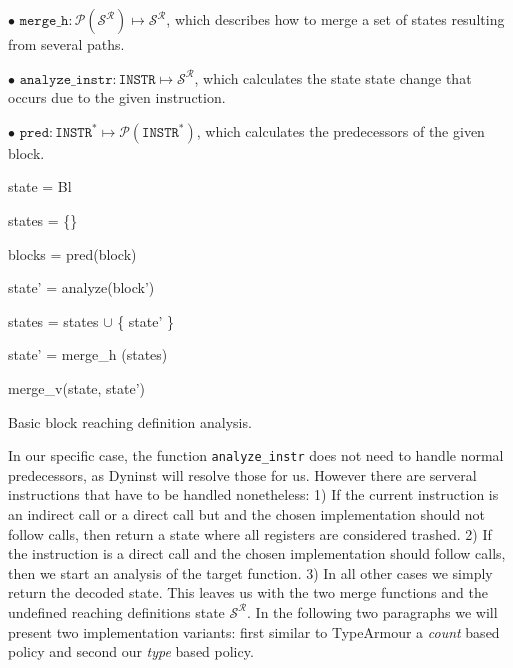 $\bullet$ $\texttt{merge\_h} : \mathcal{P}(\mathcal{S}^\mathcal{R}) \mapsto \mathcal{S}^\mathcal{R}$, which describes how to merge a set of states resulting from several paths.

$\bullet$ $\texttt{analyze\_instr} : \texttt{INSTR} \mapsto \mathcal{S}^\mathcal{R}$, which calculates the state state change that occurs due to the given instruction.

$\bullet$ $\texttt{pred} : \texttt{INSTR}^* \mapsto \mathcal{P}(\texttt{INSTR}^*)$, which calculates the predecessors of the given block.


\begin{algorithm}[!ht]
	\SetAlgoLined
        \BlankLine
	{
 	state = Bl                                   
 	

	states = \{\}                                
	
	blocks = pred(block)                         
	
	 {
	
 		state' = analyze(block')             
 		
		states = states $\cup$ \{ state' \}  
	}

	state' = merge\_h (states)                   

	\Return merge\_v(state, state')              

	}
\caption{Basic block reaching definition analysis.}
\label{alg:reaching}
\end{algorithm}

In our specific case, the function \texttt{analyze\_instr} does not need to handle normal predecessors, as Dyninst will resolve those for us. 
However there are serveral instructions that have to be handled nonetheless: 1) If the current instruction is an indirect call or a direct call 
but and the chosen implementation should not follow calls, then return a state where all registers are considered trashed. 2) If the instruction 
is a direct call and the chosen implementation should follow calls, then we start an analysis of the target function. 3) In all other cases we 
simply return the decoded state. This leaves us with the two merge functions and the undefined reaching definitions state $\mathcal{S}^\mathcal{R}$. 
In the following two paragraphs we will present two implementation variants: first similar to TypeArmour a \emph{count} based policy and second our \emph{type} based policy. 


